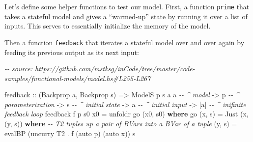 \documentclass[]{article}
\newenvironment{Shaded}{}{}
\newcommand{\CommentTok}[1]{\textcolor[rgb]{0.38,0.63,0.69}{\textit{#1}}}
\newcommand{\DataTypeTok}[1]{\textcolor[rgb]{0.56,0.13,0.00}{#1}}
\newcommand{\FunctionTok}[1]{\textcolor[rgb]{0.02,0.16,0.49}{#1}}
\newcommand{\KeywordTok}[1]{\textcolor[rgb]{0.00,0.44,0.13}{\textbf{#1}}}
\newcommand{\NormalTok}[1]{#1}
\newcommand{\OperatorTok}[1]{\textcolor[rgb]{0.40,0.40,0.40}{#1}}
\newcommand{\OtherTok}[1]{\textcolor[rgb]{0.00,0.44,0.13}{#1}}
\begin{document}
Let's define some helper functions to test our model. First, a function
\texttt{prime} that takes a stateful model and gives a ``warmed-up'' state by
running it over a list of inputs. This serves to essentially initialize the
memory of the model.

\begin{Shaded}
\end{Shaded}

Then a function \texttt{feedback} that iterates a stateful model over and over
again by feeding its previous output as its next input:

\begin{Shaded}
\begin{Highlighting}[]
\CommentTok{{-}{-} source: https://github.com/mstksg/inCode/tree/master/code{-}samples/functional{-}models/model.hs\#L255{-}L267}

\NormalTok{feedback}
\OtherTok{    ::}\NormalTok{ (}\DataTypeTok{Backprop}\NormalTok{ a, }\DataTypeTok{Backprop}\NormalTok{ s)}
    \OtherTok{=>} \DataTypeTok{ModelS}\NormalTok{ p s a a     }\CommentTok{{-}{-} \^{} model}
    \OtherTok{{-}>}\NormalTok{ p                  }\CommentTok{{-}{-} \^{} parameterization}
    \OtherTok{{-}>}\NormalTok{ s                  }\CommentTok{{-}{-} \^{} initial state}
    \OtherTok{{-}>}\NormalTok{ a                  }\CommentTok{{-}{-} \^{} initial input}
    \OtherTok{{-}>}\NormalTok{ [a]                }\CommentTok{{-}{-} \^{} inifinite feedback loop}
\NormalTok{feedback f p s0 x0 }\OtherTok{=}\NormalTok{ unfoldr go (x0, s0)}
  \KeywordTok{where}
\NormalTok{    go (x, s) }\OtherTok{=} \DataTypeTok{Just}\NormalTok{ (x, (y, s\textquotesingle{}))}
      \KeywordTok{where}
        \CommentTok{{-}{-} \textquotesingle{}T2\textquotesingle{} tuples up a pair of \textquotesingle{}BVar\textquotesingle{}s into a \textquotesingle{}BVar\textquotesingle{} of a tuple}
\NormalTok{        (y, s\textquotesingle{}) }\OtherTok{=}\NormalTok{ evalBP (}\FunctionTok{uncurry} \DataTypeTok{T2} \OperatorTok{.}\NormalTok{ f (auto p) (auto x)) s}
\end{Highlighting}
\end{Shaded}
\end{document}
